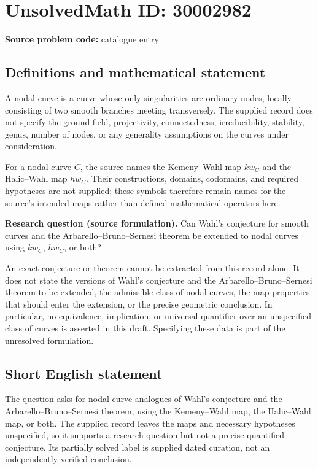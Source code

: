 \documentclass[11pt]{article}
\begin{document}
\section*{UnsolvedMath ID: 30002982}
\textbf{Source problem code:} catalogue entry
\subsection{Definitions and mathematical statement}
A nodal curve is a curve whose only singularities are ordinary nodes, locally consisting of two smooth branches meeting transversely. The supplied record does not specify the ground field, projectivity, connectedness, irreducibility, stability, genus, number of nodes, or any generality assumptions on the curves under consideration.

For a nodal curve \(C\), the source names the Kemeny--Wahl map \(kw_C\) and the Halic--Wahl map \(hw_C\). Their constructions, domains, codomains, and required hypotheses are not supplied; these symbols therefore remain names for the source's intended maps rather than defined mathematical operators here.

\textbf{Research question (source formulation).} Can Wahl's conjecture for smooth curves and the Arbarello--Bruno--Sernesi theorem be extended to nodal curves using \(kw_C\), \(hw_C\), or both?

An exact conjecture or theorem cannot be extracted from this record alone. It does not state the versions of Wahl's conjecture and the Arbarello--Bruno--Sernesi theorem to be extended, the admissible class of nodal curves, the map properties that should enter the extension, or the precise geometric conclusion. In particular, no equivalence, implication, or universal quantifier over an unspecified class of curves is asserted in this draft. Specifying these data is part of the unresolved formulation.
\subsection{Short English statement}
The question asks for nodal-curve analogues of Wahl's conjecture and the Arbarello--Bruno--Sernesi theorem, using the Kemeny--Wahl map, the Halic--Wahl map, or both. The supplied record leaves the maps and necessary hypotheses unspecified, so it supports a research question but not a precise quantified conjecture. Its partially solved label is supplied dated curation, not an independently verified conclusion.
\end{document}
